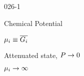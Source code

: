 \begin{mitframe}{026-1}

 	
    \begin{listone}
 
    	\item Chemical Potential
    
    	\begin{listtwo}
        
        	\item $\chempot_{\state} \equiv \overline{\gibbs_{\state}}$
            
            \item Attenuated state, $\p \rightarrow 0$
            
            \begin{listthree}

				\item $\chempot_{\state} \rightarrow \infty$
	
			\end{listthree}

		\end{listtwo}    
        
\end{listone}        
        
\end{mitframe}